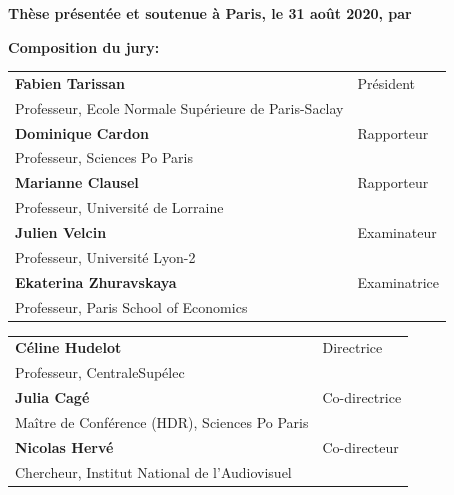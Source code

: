 \begin{titlepage}
\textbf{Thèse présentée et soutenue à Paris, le 31 août 2020, par}\\
\bigskip
\Large {\color{Prune} \textbf{\PhDname}}



\flushleft \small \textbf{Composition du jury:}
\bigskip



\scriptsize
\begin{tabular}{|p{8cm}l}
\arrayrulecolor{Prune}
\textbf{Fabien Tarissan} &   Président\\ 
Professeur,  Ecole Normale Supérieure de Paris-Saclay& \\
\textbf{Dominique Cardon} &  Rapporteur \\ 
Professeur, Sciences Po Paris &   \\ 
\textbf{Marianne Clausel} &  Rapporteur \\ 
Professeur, Université de Lorraine   &   \\ 
\textbf{Julien Velcin} &  Examinateur \\ 
Professeur, Université Lyon-2   &   \\ 
\textbf{Ekaterina Zhuravskaya} &  Examinatrice \\ 
Professeur, Paris School of Economics   &   \\ 
\end{tabular} 

\medskip
\begin{tabular}{|p{8cm}l}\arrayrulecolor{white}
\textbf{Céline Hudelot} &   Directrice\\ 
Professeur, CentraleSupélec  & \\
\textbf{Julia Cagé} &   Co-directrice\\ 
Maître de Conférence (HDR), Sciences Po Paris  &   \\ 
\textbf{Nicolas Hervé} & Co-directeur\\ 
Chercheur, Institut National de l'Audiovisuel  &   \\



\end{tabular} 


\end{titlepage}